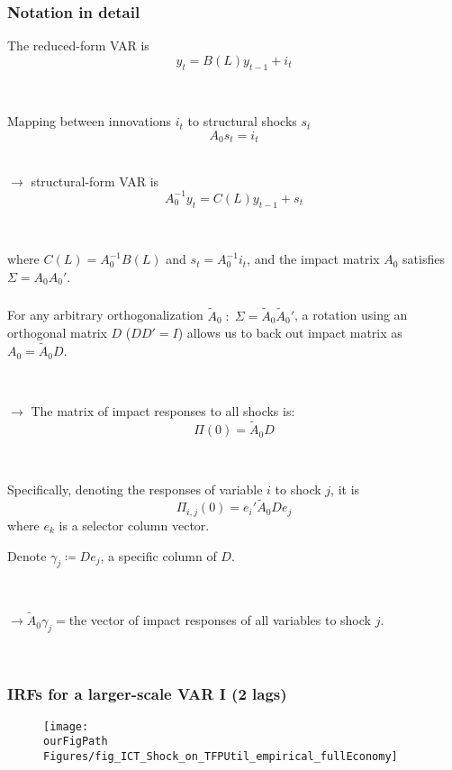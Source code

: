 \documentclass{beamer}
\def \ourFigPath {../../}
\begin{document}
\begin{frame}
	\frametitle{Notation in detail}
	\label{VAR_notation}
The reduced-form VAR is
$$
y_t = B(L)y_{t-1} + i_t 
$$

\

Mapping between innovations $i_t$ to structural shocks $s_t$
$$
A_0 s_t = i_t
$$
\

$\rightarrow$ structural-form VAR is
$$
A_0^{-1}y_t = C(L) y_{t-1} + s_t
$$

\

where $C(L) = A_0^{-1} B(L)$ and $s_t = A_0^{-1} i_t$, and the impact matrix $A_0$ satisfies $\Sigma = A_0 A_0'$. 

\end{frame}

\begin{frame}
	\frametitle{}

For any arbitrary orthogonalization $\tilde{A}_0 \; : \; \Sigma = \tilde{A}_0 \tilde{A}_0'$, a rotation using an orthogonal matrix $D$ ($DD' = I$) allows us to back out impact matrix as $A_0 = \tilde{A}_0 D$. 

\

$\rightarrow$ The matrix of impact responses to all shocks is: 
$$
\Pi(0) = \tilde{A}_0 D
$$

\

Specifically, denoting the responses of variable $i$ to shock $j$, it is
$$
\Pi_{i,j}(0) = e_i' \tilde{A}_0 D e_j
$$
where $e_k$ is a selector column vector.

Denote $\gamma_j \coloneqq De_j$, a specific column of $D$. 

\

$\rightarrow \tilde{A}_0\gamma_j =$the vector of impact responses of all variables to shock $j$.

\

\hyperlink{baseline_spec}{}	
\end{frame}

\begin{frame}
	\frametitle{IRFs for a larger-scale VAR I (2 lags)}
	\label{largeVAR}

\begin{figure}[h!]
\begin{center}
\texttt{[image: \\ourFigPath Figures/fig\_ICT\_Shock\_on\_TFPUtil\_empirical\_fullEconomy]}
\end{center}
\end{figure}

\

\hyperlink{results2}{}	
\end{frame}
\end{document}

